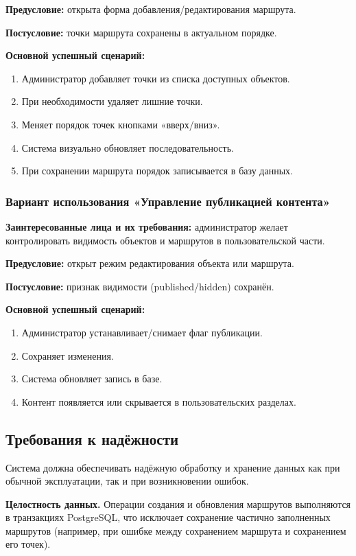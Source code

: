 \textbf{Предусловие:} открыта форма добавления/редактирования маршрута.

\textbf{Постусловие:} точки маршрута сохранены в актуальном порядке.

\textbf{Основной успешный сценарий:}
\begin{enumerate}
	\item Администратор добавляет точки из списка доступных объектов.
	\item При необходимости удаляет лишние точки.
	\item Меняет порядок точек кнопками «вверх/вниз».
	\item Система визуально обновляет последовательность.
	\item При сохранении маршрута порядок записывается в базу данных.
\end{enumerate}

\subsubsection{Вариант использования «Управление публикацией контента»}
\textbf{Заинтересованные лица и их требования:} администратор желает контролировать видимость объектов и маршрутов в пользовательской части.

\textbf{Предусловие:} открыт режим редактирования объекта или маршрута.

\textbf{Постусловие:} признак видимости (published/hidden) сохранён.

\textbf{Основной успешный сценарий:}
\begin{enumerate}
	\item Администратор устанавливает/снимает флаг публикации.
	\item Сохраняет изменения.
	\item Система обновляет запись в базе.
	\item Контент появляется или скрывается в пользовательских разделах.
\end{enumerate}

\subsection{Требования к надёжности}
Система должна обеспечивать надёжную обработку и хранение данных как при
обычной эксплуатации, так и при возникновении ошибок.

\textbf{Целостность данных.} Операции создания и обновления маршрутов
выполняются в транзакциях PostgreSQL, что исключает сохранение частично
заполненных маршрутов (например, при ошибке между сохранением маршрута и
сохранением его точек).

